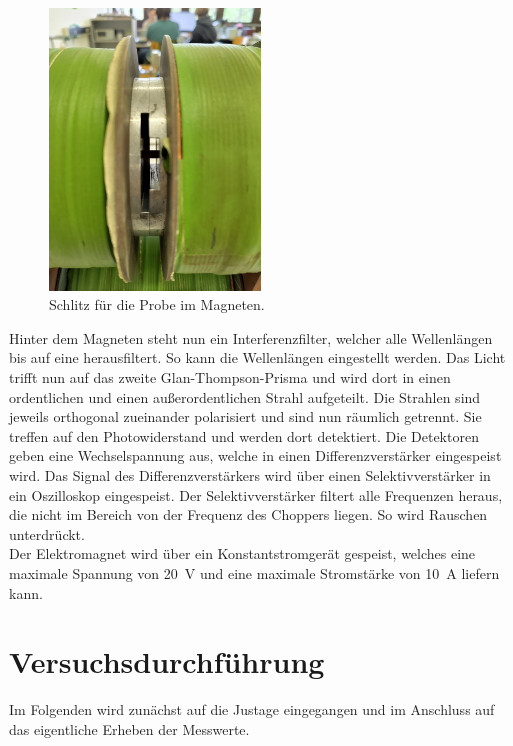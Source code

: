 \begin{figure}[H]
    \includegraphics[width=0.5\textwidth]{Schlitz.jpg}
    \caption{Schlitz für die Probe im Magneten.}
    \label{fig:Schlitz}
\end{figure}

\noindent Hinter dem Magneten steht nun ein Interferenzfilter, welcher alle Wellenlängen bis auf eine herausfiltert. So kann die 
Wellenlängen eingestellt werden. Das Licht trifft nun auf das zweite Glan-Thompson-Prisma und wird dort in einen ordentlichen und einen 
außerordentlichen Strahl aufgeteilt. Die Strahlen sind jeweils orthogonal zueinander polarisiert und sind nun räumlich getrennt. Sie 
treffen auf den Photowiderstand und werden dort detektiert. Die Detektoren geben eine Wechselspannung aus, welche in einen Differenzverstärker 
eingespeist wird. Das Signal des Differenzverstärkers wird über einen Selektivverstärker in ein Oszilloskop eingespeist. Der Selektivverstärker 
filtert alle Frequenzen heraus, die nicht im Bereich von der Frequenz des Choppers liegen. So wird Rauschen unterdrückt.\\ 
Der Elektromagnet wird über ein Konstantstromgerät gespeist, welches eine maximale Spannung von \qty{20}{\volt} und eine maximale Stromstärke 
von \qty{10}{\ampere} liefern kann.

\section{Versuchsdurchführung}
\noindent Im Folgenden wird zunächst auf die Justage eingegangen und im Anschluss auf das eigentliche Erheben der Messwerte.

